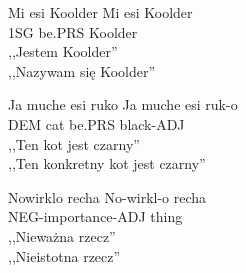 \begin{spacing}{1.1}
\begin{exe}
	\ex
    \trans Mi esi Koolder
	\gll  Mi esi Koolder \\
	  1SG be.PRS Koolder \\
	\glt  ,,Jestem Koolder'' \\ ,,Nazywam się Koolder''
  \end{exe}

\begin{exe}
	\ex
	\trans Ja muche esi ruko
	\gll  Ja muche esi ruk-o \\
	  DEM cat be.PRS black-ADJ \\
	\glt  ,,Ten kot jest czarny'' \\ ,,Ten konkretny kot jest czarny''
\end{exe}

\begin{exe}
	\ex
	\trans Nowirklo recha
	\gll  No-wirkl-o recha \\
	  NEG-importance-ADJ thing \\
	\glt  ,,Nieważna rzecz'' \\ ,,Nieistotna rzecz''
\end{exe}

\end{spacing}